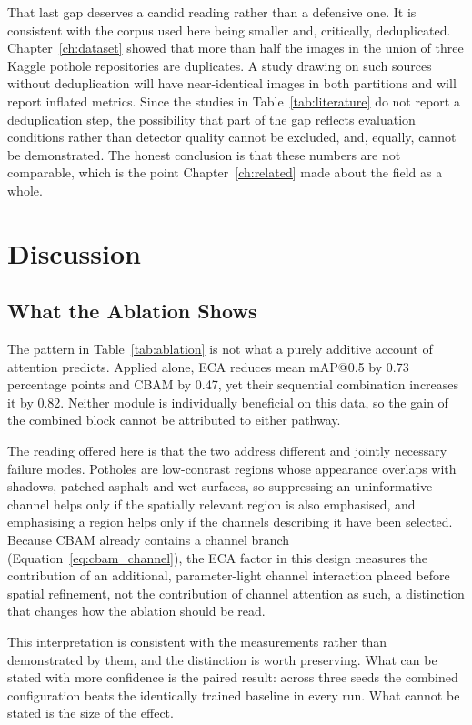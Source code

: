 \documentclass[MScCS]{uccthesis}
\begin{document}
That last gap deserves a candid reading rather than a defensive one. It is
consistent with the corpus used here being smaller and, critically,
deduplicated. Chapter~\ref{ch:dataset} showed that more than half the images in
the union of three Kaggle pothole repositories are duplicates. A study drawing
on such sources without deduplication will have near-identical images in both
partitions and will report inflated metrics. Since the studies in
Table~\ref{tab:literature} do not report a deduplication step, the possibility
that part of the gap reflects evaluation conditions rather than detector
quality cannot be excluded, and, equally, cannot be demonstrated. The honest
conclusion is that these numbers are not comparable, which is the point
Chapter~\ref{ch:related} made about the field as a whole.

\section{Discussion}
\label{sec:discussion}

\subsection{What the Ablation Shows}

The pattern in Table~\ref{tab:ablation} is not what a purely additive account of
attention predicts. Applied alone, ECA reduces mean mAP@0.5 by 0.73 percentage
points and CBAM by 0.47, yet their sequential combination increases it by 0.82.
Neither module is individually beneficial on this data, so the gain of the
combined block cannot be attributed to either pathway.

The reading offered here is that the two address different and jointly
necessary failure modes. Potholes are low-contrast regions whose appearance
overlaps with shadows, patched asphalt and wet surfaces, so suppressing an
uninformative channel helps only if the spatially relevant region is also
emphasised, and emphasising a region helps only if the channels describing it
have been selected. Because CBAM already contains a channel branch
(Equation~\eqref{eq:cbam_channel}), the ECA factor in this design measures the
contribution of an additional, parameter-light channel interaction placed
before spatial refinement, not the contribution of channel attention as such, a distinction that changes how the ablation should be read.

This interpretation is consistent with the measurements rather than
demonstrated by them, and the distinction is worth preserving. What can be
stated with more confidence is the paired result: across three seeds the
combined configuration beats the identically trained baseline in every run.
What cannot be stated is the size of the effect.
\end{document}
